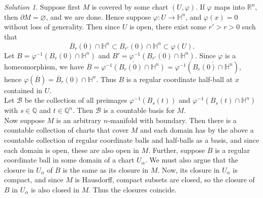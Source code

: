 \documentclass[reqno]{amsart}
\theoremstyle{plain}%
\theoremstyle{definition}
\theoremstyle{remark}
\newtheorem*{solution}{Solution}
\begin{document}
        \begin{solution}
            Suppose first $M$ is covered by some chart
            $\left( U, \varphi \right) $. If
            $\varphi$ maps into $\mathbb{R}^{n}$, then
            $\partial M = \varnothing$, and we are done.
            Hence suppose $\varphi  \colon
            U \to \mathbb{H}^{n}$, and
            $\varphi(x) = 0$ without loss of generality.
            Then since $U$ is open, there exist some
            $r' > r > 0$ such that
            \[
                \overline{B}_r(0) \cap \mathbb{H}^{n}
                \subset 
                B_{r'}(0) \cap \mathbb{H}^{n}
                \subset \varphi(U).
            \] 
            Let
            $B = \varphi^{-1}\left( 
            B_r(0) \cap \mathbb{H}^{n} \right) $ and
            $B' = \varphi^{-1}\left( 
            B_{r'}(0) \cap \mathbb{H}^{n}\right) $.
            Since $\varphi$ is a homeomorphism, we have
            $\overline{B} =
            \overline{\varphi^{-1}\left( 
            B_r(0) \cap \mathbb{H}^{n}\right) }
            = \varphi^{-1}\left( 
            \overline{B_r(0) \cap \mathbb{H}^{n}}\right) $, hence
            $\varphi\left( \overline{B} \right) 
            = \overline{B}_r(0) \cap \mathbb{H}^{n}$.
            Thus $B$ is a regular coordinate half-ball
            at $x$ contained in $U$.\\
            Let
            $\mathcal{B}$ be the collection of all preimages
            $\varphi^{-1}\left( 
            B_s(t) \right) $ and
            $\varphi^{-1}\left( B_s(t) \cap \mathbb{H}^{n} \right) $
            with $s \in \mathbb{Q}$ and
            $t \in \mathbb{Q}^{n}$. Then
            $\mathcal{B}$ is a countable basis for $M$.\\
            Now suppose $M$ is an arbitrary $n$-manifold with
            boundary. Then there is a countable collection
            of charts that cover $M$ and each domain has by the above
            a countable collection of regular coordinate balls and 
            half-balls as a basis, and since each domain is open, these
            are also open in $M$. Further, suppose
            $B$ is a regular coordinate ball in some domain of a chart
            $U_{\alpha}$. We must also argue that the
            closure in $U_{\alpha}$ of $B$ is the same as
            its closure in $M$. Now, its closure in
            $U_{\alpha}$ is compact, and since $M$ is Hausdorff,
            compact subsets are closed, so the closure 
            of $B$ in $U_{\alpha}$ is also closed in $M$.
            Thus the closures coincide.
        \end{solution}
\end{document}

